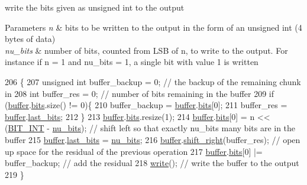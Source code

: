 write the bits given as unsigned int to the output 


\begin{DoxyParams}{Parameters}
{\em n} & bits to be written to the output in the form of an unsigned int (4 bytes of data) \\
\hline
{\em nu\+\_\+bits} & number of bits, counted from L\+SB of n, to write to the output. For instance if n = 1 and nu\+\_\+bits = 1, a single bit with value 1 is written \\
\hline
\end{DoxyParams}

\begin{DoxyCode}
206                                                                \{
207   \textcolor{keywordtype}{unsigned} \textcolor{keywordtype}{int} buffer\_backup = 0; \textcolor{comment}{// the backup of the remaining chunk in }
208   \textcolor{keywordtype}{int} buffer\_res = 0; \textcolor{comment}{// number of bits remaining in the buffer}
209   \textcolor{keywordflow}{if} (\hyperlink{classobitstream_aeaccad00a395a404aa16472bfa052be3}{buffer}.\hyperlink{classbit__pipe_a86f38af1e9736b053728033490476b50}{bits}.size() != 0)\{
210     buffer\_backup = \hyperlink{classobitstream_aeaccad00a395a404aa16472bfa052be3}{buffer}.\hyperlink{classbit__pipe_a86f38af1e9736b053728033490476b50}{bits}[0];
211     buffer\_res = \hyperlink{classobitstream_aeaccad00a395a404aa16472bfa052be3}{buffer}.\hyperlink{classbit__pipe_a0f3e84b02751803adaab499b5dad86fe}{last\_bits};
212   \}
213   \hyperlink{classobitstream_aeaccad00a395a404aa16472bfa052be3}{buffer}.\hyperlink{classbit__pipe_a86f38af1e9736b053728033490476b50}{bits}.resize(1);
214   \hyperlink{classobitstream_aeaccad00a395a404aa16472bfa052be3}{buffer}.\hyperlink{classbit__pipe_a86f38af1e9736b053728033490476b50}{bits}[0] = n << (\hyperlink{bitstream_8h_afcadf5aa65c5159bfb96c4d82ebc0a5d}{BIT\_INT} - \hyperlink{bitstream_8cpp_a9dfce6f51e3febb3973aa3b16c2fecb4}{nu\_bits}); \textcolor{comment}{// shift left so that exactly nu\_bits
       many bits are in the buffer}
215   \hyperlink{classobitstream_aeaccad00a395a404aa16472bfa052be3}{buffer}.\hyperlink{classbit__pipe_a0f3e84b02751803adaab499b5dad86fe}{last\_bits} = \hyperlink{bitstream_8cpp_a9dfce6f51e3febb3973aa3b16c2fecb4}{nu\_bits};
216   \hyperlink{classobitstream_aeaccad00a395a404aa16472bfa052be3}{buffer}.\hyperlink{classbit__pipe_a341a1f62d728a67f730503ca722a7770}{shift\_right}(buffer\_res); \textcolor{comment}{// open up space for the residual of the previous
       operation}
217   \hyperlink{classobitstream_aeaccad00a395a404aa16472bfa052be3}{buffer}.\hyperlink{classbit__pipe_a86f38af1e9736b053728033490476b50}{bits}[0] |= buffer\_backup; \textcolor{comment}{// add the residual }
218   \hyperlink{classobitstream_a5ac23633932baad040856f0a33ee1ebf}{write}(); \textcolor{comment}{// write the buffer to the output}
219 \}
\end{DoxyCode}


